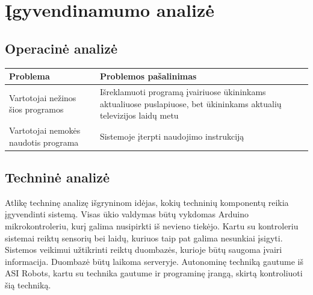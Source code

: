 \documentclass[oneside]{VUMIFPSkursinis}
\begin{document}
\section{Įgyvendinamumo analizė}
	\subsection{Operacinė analizė}
\begin{table}[htbp]
	\begin{tabularx}{1\textwidth}{ |P{7.5cm}|X| }  \hline
		Problema & Problemos pašalinimas \\ \hline
		Vartotojai nežinos šios programos & Išreklamuoti programą įvairiuose ūkininkams aktualiuose puslapiuose, bet ūkininkams aktualių televizijos laidų metu \\ \hline
		Vartotojai nemokės naudotis programa & Sistemoje įterpti naudojimo instrukciją \\ \hline
	\end{tabularx}
\end{table}
	\subsection{Techninė analizė}
Atlikę techninę analizę išgryninom idėjas, kokių techninių komponentų reikia įgyvendinti sistemą. Visas ūkio valdymas būtų vykdomas Arduino mikrokontroleriu, kurį galima nusipirkti iš nevieno tiekėjo. Kartu su kontroleriu sistemai reiktų sensorių bei laidų, kuriuos taip pat galima nesunkiai įsigyti. Sistemos veikimui užtikrinti reiktų duombazės, kurioje būtų saugoma įvairi informacija. Duombazė būtų laikoma serveryje. Autonominę techniką gautume iš ASI Robots, kartu su technika gautume ir programinę įrangą, skirtą kontroliuoti šią techniką.
\end{document}

